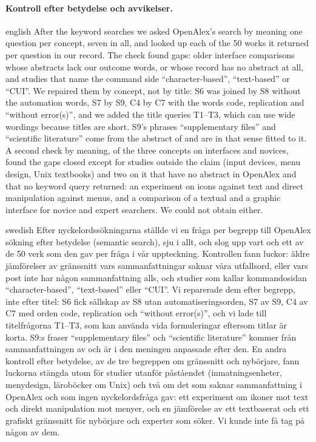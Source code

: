 \paragraph{%
  {Kontroll efter betydelse och avvikelser.}} %
\begin{onlyin}{english} %
After the keyword searches we asked OpenAlex's search by meaning one
question per concept, seven in all, and looked up each of the 50 works
it returned per question in our record.  The check found gaps: older
interface comparisons whose abstracts lack our outcome words, or whose
record has no abstract at all, and studies that name the command side
\enquote{character-based}, \enquote{text-based} or \enquote{CUI}.  We
repaired them by concept, not by title: S6 was joined by S8 without
the automation words, S7 by S9, C4 by C7 with the words code,
replication and \enquote{without error(s)}, and we added the title
queries T1--T3, which can use wide wordings because titles are short.
S9's phrases \enquote{supplementary files} and \enquote{scientific
literature} come from the abstract of \textcite{Ziemann2016Gene} and
are in that sense fitted to it.  A second check by meaning, of the
three concepts on interfaces and novices, found the gaps closed except
for studies outside the claim (input devices, menu design, Unix
textbooks) and two on it that have no abstract in OpenAlex and that no
keyword query returned: an experiment on icons against text and direct
manipulation against menus, and a comparison of a textual and a
graphic interface for novice and expert searchers.  We could not
obtain either.
\end{onlyin}
\begin{onlyin}{swedish}
Efter nyckelordssökningarna ställde vi en fråga per begrepp till
OpenAlex sökning efter betydelse (\foreignlanguage{english}{semantic
search}), sju i allt, och slog upp vart och ett
av de 50 verk som den gav per fråga i vår uppteckning.  Kontrollen fann
luckor: äldre jämförelser av gränssnitt vars sammanfattningar saknar
våra utfallsord, eller vars post inte har någon sammanfattning alls, och
studier som kallar kommandosidan \enquote{character-based},
\enquote{text-based} eller \enquote{CUI}.  Vi reparerade dem efter
begrepp, inte efter titel: S6 fick sällskap av S8 utan
automatiseringsorden, S7 av S9, C4 av C7 med orden code, replication och
\enquote{without error(s)}, och vi lade till titelfrågorna T1--T3, som
kan använda vida formuleringar eftersom titlar är korta.  S9:s fraser
\enquote{supplementary files} och \enquote{scientific literature} kommer
från sammanfattningen av \textcite{Ziemann2016Gene} och är i den
meningen anpassade efter den.  En andra kontroll efter betydelse, av de
tre begreppen om gränssnitt och nybörjare, fann luckorna stängda utom
för studier utanför påståendet (inmatningsenheter, menydesign, läroböcker
om Unix) och två om det som saknar sammanfattning i OpenAlex och som
ingen nyckelordsfråga gav: ett experiment om ikoner mot text och direkt
manipulation mot menyer, och en jämförelse av ett textbaserat och ett
grafiskt gränssnitt för nybörjare och experter som söker.  Vi kunde inte
få tag på någon av dem.
\end{onlyin}

